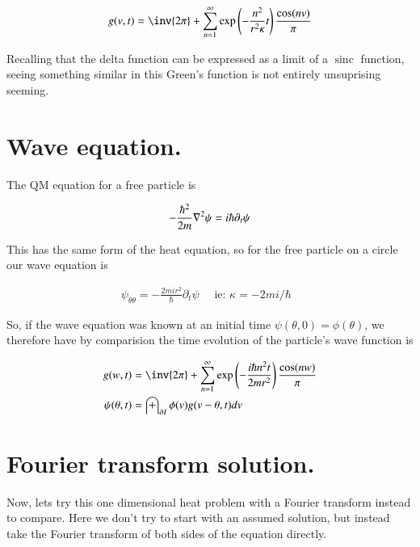 \documentclass{article}
\DeclareMathOperator{\sinc}{sinc}
\begin{document}
\begin{align*}
g( v , t ) &= \inv{2 \pi} + \sum_{n=1}^\infty \exp\left(- \frac{n^2}{ r^2 \kappa } t \right) \frac{\cos(n v )}{\pi} \\
\end{align*}

Recalling that the delta function can be expressed as a limit of a $\sinc$ function, seeing something similar
in this Green's function is not entirely unsuprising seeming.

\section{ Wave equation. }

The QM equation for a free particle is

\begin{align}\label{eqn:schro}
-\frac{\hbar^2}{2m} \nabla^2 \psi = i \hbar \partial_t \psi
\end{align}

This has the same form of the heat equation, so for the free particle on a circle our wave equation is

\begin{align*}
\psi_{\theta\theta} = - \frac{2 m i r^2 }{\hbar} \partial_t \psi \quad \mbox{ ie: $\kappa = - 2 m i /\hbar$ }
\end{align*}

So, if the wave equation was known at an initial time $\psi(\theta, 0) = \phi(\theta)$, we therefore have by comparision the time evolution of the particle's wave function is

\begin{align*}
g( w, t ) &= \inv{2 \pi} + \sum_{n=1}^\infty \exp\left(- \frac{i \hbar n^2 t}{ 2 m r^2 } \right) \frac{\cos(n w )}{\pi} \\
\psi(\theta, t) &= \int_{\partial I} \phi(v) g(v - \theta, t) dv 
\end{align*}


\section{ Fourier transform solution. }

Now, lets try this one dimensional heat problem with a Fourier transform instead to compare.  Here we don't try to start with an
assumed solution, but instead take the Fourier transform of both sides of the equation directly.
\end{document}
